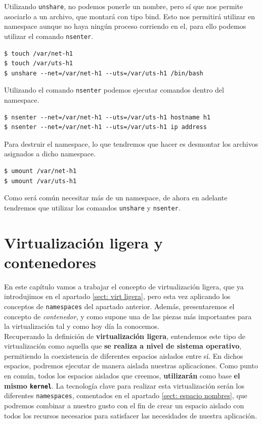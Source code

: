 \documentclass[12pt]{article}
\begin{document}
	\noindent Utilizando \texttt{unshare}, no podemos ponerle un nombre, pero sí que nos permite asociarlo a un archivo, que montará con tipo bind. Esto nos permitirá utilizar en namespace aunque no haya ningún proceso corriendo en el, para ello podemos utilizar el comando \texttt{nsenter}.
	\begin{verbatim}
$ touch /var/net-h1
$ touch /var/uts-h1
$ unshare --net=/var/net-h1 --uts=/var/uts-h1 /bin/bash
	\end{verbatim}

	\noindent Utilizando el comando \texttt{nsenter} podemos ejecutar comandos dentro del namespace.
	\begin{verbatim}
$ nsenter --net=/var/net-h1 --uts=/var/uts-h1 hostname h1
$ nsenter --net=/var/net-h1 --uts=/var/uts-h1 ip address
	\end{verbatim}

	\noindent Para destruir el namespace, lo que tendremos que hacer es desmontar los archivos asignados a dicho namespace.
	\begin{verbatim}
$ umount /var/net-h1
$ umount /var/uts-h1
	\end{verbatim}

	\noindent Como será común necesitar más de un namespace, de ahora en adelante tendremos que utilizar los comandos \texttt{unshare} y \texttt{nsenter}.

	\pagebreak
	
	\section{Virtualización ligera y contenedores}
	\noindent En este capítulo vamos a trabajar el concepto de virtualización ligera, que ya introdujimos en el apartado \ref{sect: virt ligera}, pero esta vez aplicando los conceptos de \texttt{namespaces} del apartado anterior. Además, presentaremos el concepto de \textit{contenedor}, y como supone una de las piezas más importantes para la virtualización tal y como hoy día la conocemos. \\
	
	\noindent Recuperando la definición de \textbf{virtualización ligera}, entendemos este tipo de virtualización como aquella que \textbf{se realiza a nivel de sistema operativo}, permitiendo la coexistencia de diferentes espacios aislados entre sí. En dichos espacios, podremos ejecutar de manera aislada nuestras aplicaciones. Como punto en común, todos los espacios aislados que creemos, \textbf{utilizarán} como base \textbf{el mismo \texttt{kernel}}. La tecnología clave para realizar esta virtualización serán los diferentes \texttt{namespaces}, comentados en el apartado \ref{sect: espacio nombres}, que podremos combinar a nuestro gusto con el fin de crear un espacio aislado con todos los recursos necesarios para satisfacer las necesidades de nuestra aplicación. \\
	
\end{document}
